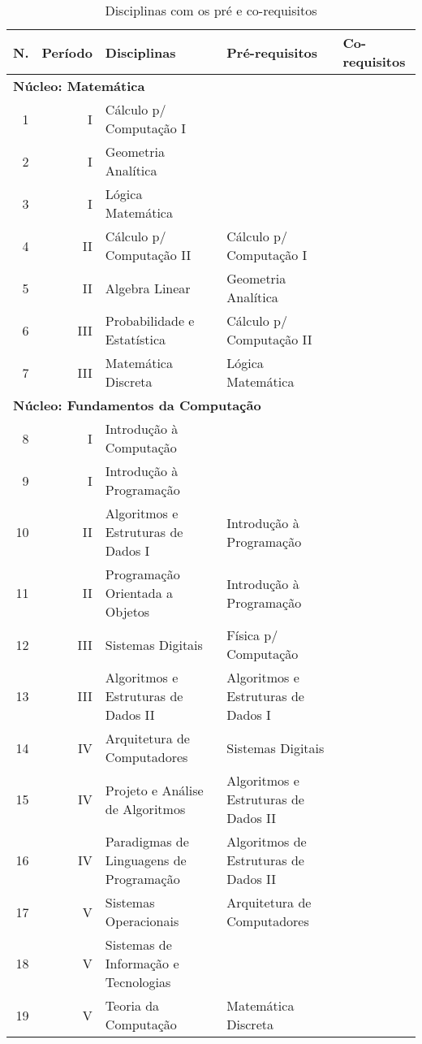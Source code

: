\documentclass[
	12pt,				%
	openright,			%
  oneside,     %
	a4paper,			%
	english,			%
	french,				%
	spanish,			%
	brazil				%
	]{abntex2}
\begin{document}
\begin{apendicesenv}
\begin{landscape}
    \begin{longtable}{r|r|l|l|l}
     \caption{Disciplinas com os pré e co-requisitos}
     \label{ltab:PreReq}
     \\
     \hline
    \textbf{N.} & \textbf{Período} & \textbf{Disciplinas} & \textbf{Pré-requisitos} & \textbf{Co-requisitos} \\
\hline
\multicolumn{5}{l}{\textbf{Núcleo: Matemática}}\\ \hline
    1     & I     & Cálculo p/ Computação I &       &       \\ \hline
    2     & I     & Geometria Analítica &       &        \\ \hline
    3     & I     & Lógica Matemática &       &        \\ \hline
    4     & II    & Cálculo p/ Computação II & Cálculo p/ Computação I &       \\ \hline
    5     & II    & Algebra Linear & Geometria Analítica &        \\ \hline
    6     & III   & Probabilidade e Estatística & Cálculo p/ Computação II &       \\ \hline
    7     & III   & Matemática Discreta & Lógica Matemática &        \\ \hline

\multicolumn{5}{l}{\textbf{Núcleo: Fundamentos da Computação}}\\ \hline
    8     & I     & Introdução à Computação &       &        \\ \hline
    9     & I     & Introdução à Programação &       &      \\ \hline
    10    & II    & Algoritmos e Estruturas de Dados I & Introdução à Programação &       \\ \hline
    11    & II    & Programação Orientada a Objetos & Introdução à Programação &       \\ \hline
    12    & III   & Sistemas Digitais & Física p/ Computação &       \\ \hline
    13    & III   & Algoritmos e Estruturas de Dados II & Algoritmos e Estruturas de Dados I &       \\ \hline
    14    & IV    & Arquitetura de Computadores & Sistemas Digitais &       \\ \hline
    15    & IV    & Projeto e Análise de Algoritmos & Algoritmos e Estruturas de Dados II &       \\ \hline
    16    & IV    & Paradigmas de Linguagens de Programação & Algoritmos de Estruturas de Dados II &       \\ \hline
    17    & V     & Sistemas Operacionais & Arquitetura de Computadores &       \\ \hline
    18    & V     & Sistemas de Informação e Tecnologias &       &       \\ \hline
    19    & V     & Teoria da Computação & Matemática Discreta &        \\ \hline


\end{longtable}
\end{landscape}
\end{apendicesenv}
\end{document}
